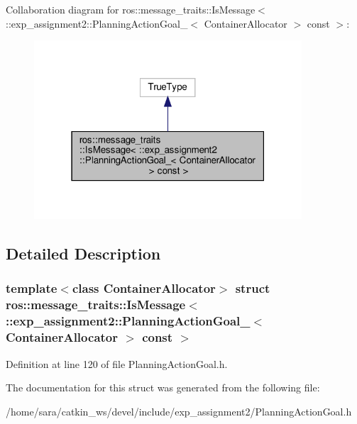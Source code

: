 Collaboration diagram for ros\+:\+:message\+\_\+traits\+:\+:Is\+Message$<$ \+:\+:exp\+\_\+assignment2\+:\+:Planning\+Action\+Goal\+\_\+$<$ Container\+Allocator $>$ const $>$\+:
\nopagebreak
\begin{figure}[H]
\begin{center}
\leavevmode
\includegraphics[width=283pt]{structros_1_1message__traits_1_1IsMessage_3_01_1_1exp__assignment2_1_1PlanningActionGoal___3_01C3c967b2bc08bc90883902c39c824f9df}
\end{center}
\end{figure}


\subsection{Detailed Description}
\subsubsection*{template$<$class Container\+Allocator$>$\newline
struct ros\+::message\+\_\+traits\+::\+Is\+Message$<$ \+::exp\+\_\+assignment2\+::\+Planning\+Action\+Goal\+\_\+$<$ Container\+Allocator $>$ const $>$}



Definition at line 120 of file Planning\+Action\+Goal.\+h.



The documentation for this struct was generated from the following file\+:\begin{DoxyCompactItemize}
\item 
/home/sara/catkin\+\_\+ws/devel/include/exp\+\_\+assignment2/Planning\+Action\+Goal.\+h\end{DoxyCompactItemize}
